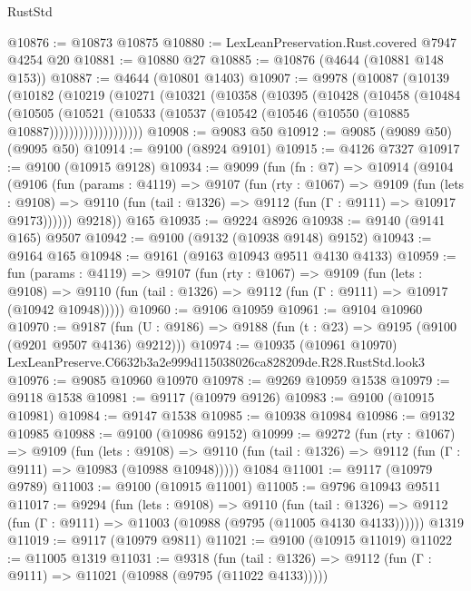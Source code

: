 \begin{lexlean}{RustStd}
\begin{coremodule}
@10876 := @10873 @10875
@10880 := LexLeanPreservation.Rust.covered @7947 @4254 @20
@10881 := @10880 @27
@10885 := @10876 (@4644 (@10881 @148 @153))
@10887 := @4644 (@10801 @1403)
@10907 := @9978
    (@10087
      (@10139
        (@10182
          (@10219
            (@10271
              (@10321
                (@10358
                  (@10395
                    (@10428
                      (@10458
                        (@10484
                          (@10505
                            (@10521
                              (@10533
                                (@10537 (@10542 (@10546 (@10550 (@10885 @10887)))))))))))))))))))
@10908 := @9083 @50
@10912 := @9085 (@9089 @50) (@9095 @50)
@10914 := @9100 (@8924 @9101)
@10915 := @4126 @7327
@10917 := @9100 (@10915 @9128)
@10934 := @9099
    (fun (fn : @7) =>
    @10914
      (@9104
        (@9106
          (fun (params : @4119) =>
          @9107
            (fun (rty : @1067) =>
            @9109
              (fun (lets : @9108) =>
              @9110 (fun (tail : @1326) => @9112 (fun (Γ : @9111) => @10917 @9173))))))
        @9218))
    @165
@10935 := @9224 @8926
@10938 := @9140 (@9141 @165) @9507
@10942 := @9100 (@9132 (@10938 @9148) @9152)
@10943 := @9164 @165
@10948 := @9161 (@9163 @10943 @9511 @4130 @4133)
@10959 := fun (params : @4119) =>
  @9107
    (fun (rty : @1067) =>
    @9109
      (fun (lets : @9108) =>
      @9110 (fun (tail : @1326) => @9112 (fun (Γ : @9111) => @10917 (@10942 @10948)))))
@10960 := @9106 @10959
@10961 := @9104 @10960
@10970 := @9187
    (fun (U : @9186) => @9188 (fun (t : @23) => @9195 (@9100 (@9201 @9507 @4136) @9212)))
@10974 := @10935 (@10961 @10970) LexLeanPreserve.C6632b3a2e999d115038026ca828209de.R28.RustStd.look3
@10976 := @9085 @10960 @10970
@10978 := @9269 @10959 @1538
@10979 := @9118 @1538
@10981 := @9117 (@10979 @9126)
@10983 := @9100 (@10915 @10981)
@10984 := @9147 @1538
@10985 := @10938 @10984
@10986 := @9132 @10985
@10988 := @9100 (@10986 @9152)
@10999 := @9272
    (fun (rty : @1067) =>
    @9109
      (fun (lets : @9108) =>
      @9110 (fun (tail : @1326) => @9112 (fun (Γ : @9111) => @10983 (@10988 @10948)))))
    @1084
@11001 := @9117 (@10979 @9789)
@11003 := @9100 (@10915 @11001)
@11005 := @9796 @10943 @9511
@11017 := @9294
    (fun (lets : @9108) =>
    @9110
      (fun (tail : @1326) =>
      @9112 (fun (Γ : @9111) => @11003 (@10988 (@9795 (@11005 @4130 @4133))))))
    @1319
@11019 := @9117 (@10979 @9811)
@11021 := @9100 (@10915 @11019)
@11022 := @11005 @1319
@11031 := @9318
    (fun (tail : @1326) => @9112 (fun (Γ : @9111) => @11021 (@10988 (@9795 (@11022 @4133)))))

\end{coremodule}
\end{lexlean}
